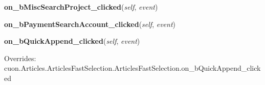     \vspace{0.5ex}

\hspace{.8\funcindent}\begin{boxedminipage}{\funcwidth}

    \raggedright \textbf{on\_bMiscSearchProject\_clicked}(\textit{self}, \textit{event})

\setlength{\parskip}{2ex}
\setlength{\parskip}{1ex}
    \end{boxedminipage}

    \label{cuon:Order:order:orderwindow:on_bPaymentSearchAccount_clicked}

    \vspace{0.5ex}

\hspace{.8\funcindent}\begin{boxedminipage}{\funcwidth}

    \raggedright \textbf{on\_bPaymentSearchAccount\_clicked}(\textit{self}, \textit{event})

\setlength{\parskip}{2ex}
\setlength{\parskip}{1ex}
    \end{boxedminipage}

    \vspace{0.5ex}

\hspace{.8\funcindent}\begin{boxedminipage}{\funcwidth}

    \raggedright \textbf{on\_bQuickAppend\_clicked}(\textit{self}, \textit{event})

\setlength{\parskip}{2ex}
\setlength{\parskip}{1ex}
      Overrides: cuon.Articles.ArticlesFastSelection.ArticlesFastSelection.on\_bQuickAppend\_clicked

    \end{boxedminipage}

    \label{cuon:Order:order:orderwindow:on_bSearchCustom_clicked}

    \vspace{0.5ex}

